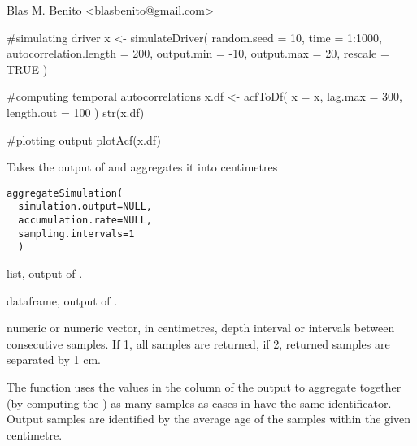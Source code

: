 \documentclass[letterpaper]{book}
\begin{document}
%
\begin{Author}\relax
Blas M. Benito  <blasbenito@gmail.com>
\end{Author}
%
\begin{SeeAlso}\relax
{}
\end{SeeAlso}
%
\begin{Examples}
\begin{ExampleCode}

#simulating driver
x <- simulateDriver(
  random.seed = 10,
  time = 1:1000,
  autocorrelation.length = 200,
  output.min = -10,
  output.max = 20,
  rescale = TRUE
  )

#computing temporal autocorrelations
x.df <- acfToDf(
  x = x,
  lag.max = 300,
  length.out = 100
  )
str(x.df)

#plotting output
plotAcf(x.df)

\end{ExampleCode}
\end{Examples}
%
\begin{Description}\relax
Takes the output of  and aggregates it into centimetres
\end{Description}
%
\begin{Usage}
\begin{verbatim}
aggregateSimulation(
  simulation.output=NULL,
  accumulation.rate=NULL,
  sampling.intervals=1
  )
\end{verbatim}
\end{Usage}
%
\begin{Arguments}
\begin{ldescription}
\item[\code{simulation.output}] list, output of .

\item[\code{accumulation.rate}] dataframe, output of .

\item[\code{sampling.intervals}] numeric or numeric vector, in centimetres, depth interval or intervals between consecutive samples. If 1, all samples are returned, if 2, returned samples are separated by 1 cm.
\end{ldescription}
\end{Arguments}
%
\begin{Details}\relax
The function uses the values in the  column of the  output to aggregate together (by computing the ) as many samples as cases in  have the same identificator. Output samples are identified by the average age of the samples within the given centimetre.
\end{Details}
\end{document}

